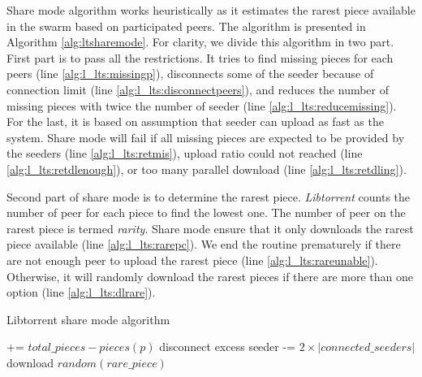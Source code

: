 Share mode algorithm works heuristically as it estimates the rarest piece available in the swarm based on participated peers. The algorithm is presented in Algorithm \ref{alg:ltsharemode}. For clarity, we divide this algorithm in two part. First part is to pass all the restrictions. It tries to find missing pieces for each peers (line \ref{alg:l_lts:missingp}), disconnects some of the seeder because of connection limit (line \ref{alg:l_lts:disconnectpeers}), and reduces the number of missing pieces with twice the number of seeder (line \ref{alg:l_lts:reducemissing}). For the last, it is based on assumption that seeder can upload as fast as the system. Share mode will fail if all missing pieces are expected to be provided by the seeders (line \ref{alg:l_lts:retmis}), upload ratio could not reached (line \ref{alg:l_lts:retdlenough}), or too many parallel download (line \ref{alg:l_lts:retdling}).

Second part of share mode is to determine the rarest piece. \textit{Libtorrent} counts the number of peer for each piece to find the lowest one. The number of peer on the rarest piece is termed \textit{rarity}. Share mode ensure that it only downloads the rarest piece available (line \ref{alg:l_lts:rarepc}). We end the routine prematurely if there are not enough peer to upload the rarest piece (line \ref{alg:l_lts:rareunable}). Otherwise, it will randomly download the rarest pieces if there are more than one option (line \ref{alg:l_lts:dlrare}). 

\begin{algorithm}[h!]
	\caption{Libtorrent share mode algorithm}
	\label{alg:ltsharemode}
	\begin{algorithmic}[1]
		\Statex \hrulefill {}
		 += {$total\_pieces - pieces(p)$} \label{alg:l_lts:missingp}
		\EndIf	
		\EndFor
		\State disconnect excess seeder \label{alg:l_lts:disconnectpeers}
		\EndIf
		 -= {$2 \times |connected\_seeders|$}	\label{alg:l_lts:reducemissing}	
		  \label{alg:l_lts:retmis}
		\State \Return 
		\EndIf
		 \label{alg:l_lts:retdlenough}
		\State \Return
		\EndIf
		 \label{alg:l_lts:retdling}
		\State \Return
		\EndIf
		\Statex \hrulefill {}
			\label{alg:l_lts:rarepc}
		\EndIf	
		\EndFor
		 \label{alg:l_lts:rareunable}
		\State \Return
		\EndIf
		\State download {$random(rare\_piece)$} \label{alg:l_lts:dlrare}
	\end{algorithmic}
\end{algorithm}

